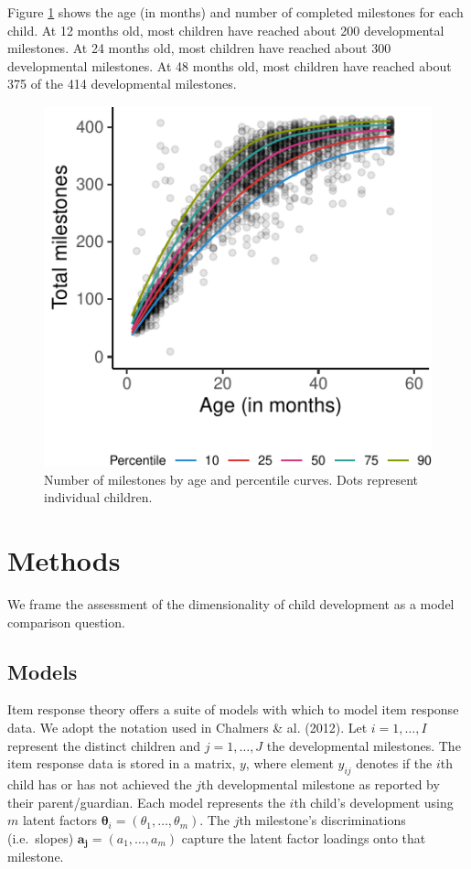 \documentclass[10pt, letterpaper]{article}
\newenvironment{CodeChunk}{}{}
\begin{document}
Figure \ref{fig:growth} shows the age (in months) and number of
completed milestones for each child. At 12 months old, most children
have reached about 200 developmental milestones. At 24 months old, most
children have reached about 300 developmental milestones. At 48 months
old, most children have reached about 375 of the 414 developmental
milestones.

\begin{CodeChunk}
\begin{figure}[tb]
\includegraphics{figs/growth-1} \caption[Number of milestones by age and percentile curves]{Number of milestones by age and percentile curves. Dots represent individual children. }\label{fig:growth}
\end{figure}
\end{CodeChunk}

\hypertarget{methods}{%
\section{Methods}\label{methods}}

We frame the assessment of the dimensionality of child development as a
model comparison question.

\hypertarget{models}{%
\subsection{Models}\label{models}}

Item response theory offers a suite of models with which to model item
response data. We adopt the notation used in Chalmers \& al. (2012). Let
\(i = 1, \ldots, I\) represent the distinct children and
\(j = 1, \ldots, J\) the developmental milestones. The item response
data is stored in a matrix, \(y\), where element \(y_{ij}\) denotes if
the \(i\)th child has or has not achieved the \(j\)th developmental
milestone as reported by their parent/guardian. Each model represents
the \(i\)th child's development using \(m\) latent factors
\(\boldsymbol{\theta}_{i}=(\theta_1, \dots, \theta_m)\). The \(j\)th
milestone's discriminations (i.e.~slopes)
\(\boldsymbol{a_j}=(a_1, \dots, a_m)\) capture the latent factor
loadings onto that milestone.
\end{document}
